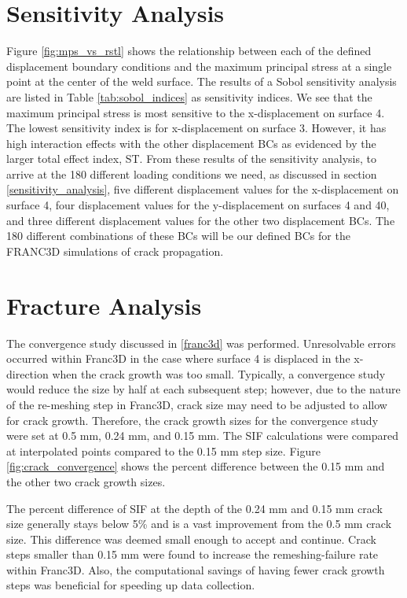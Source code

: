 \section{Sensitivity Analysis}\label{sensitivity_results}

Figure \ref{fig:mps_vs_rstl} shows the relationship between each of the defined
displacement boundary conditions and the maximum principal stress at a single
point at the center of the weld surface.  The results of a Sobol sensitivity
analysis are listed in Table \ref{tab:sobol_indices} as sensitivity indices. We
see that the maximum principal stress is most sensitive to the x-displacement on
surface 4.  The lowest sensitivity index is for x-displacement on surface 3.
However, it has high interaction effects with the other displacement BCs as
evidenced by the larger total effect index, ST. From these results of the sensitivity analysis, to arrive at the 180 different loading conditions we need,
as discussed in section \ref{sensitivity_analysis}, five different displacement
values for the x-displacement on surface 4, four displacement values for the
y-displacement on surfaces 4 and 40, and three different displacement values for
the other two displacement BCs. The 180 different combinations of these BCs will
be our defined BCs for the FRANC3D simulations of crack propagation.

\section{Fracture Analysis}\label{franc_results}

The convergence study discussed in \ref{franc3d} was performed.  Unresolvable errors
occurred within Franc3D in the case where surface 4 is displaced in the
x-direction when the crack growth was too small. Typically, a convergence study
would reduce the size by half at each subsequent step; however, due to the
nature of the re-meshing step in Franc3D, crack size may need to be adjusted to
allow for crack growth.  Therefore, the crack growth sizes for the convergence
study were set at 0.5 mm, 0.24 mm, and 0.15 mm. The SIF calculations were
compared at interpolated points compared to the 0.15 mm step size. Figure
\ref{fig:crack_convergence} shows the percent difference between the 0.15 mm and
the other two crack growth sizes.

The percent difference of SIF at the depth of the 0.24 mm and 0.15 mm crack size
generally stays below 5\% and is a vast improvement from the 0.5 mm crack size.
This difference was deemed small enough to accept and continue. Crack steps
smaller than 0.15 mm were found to increase the remeshing-failure rate within
Franc3D. Also, the computational savings of having fewer crack growth steps was
beneficial for speeding up data collection.

